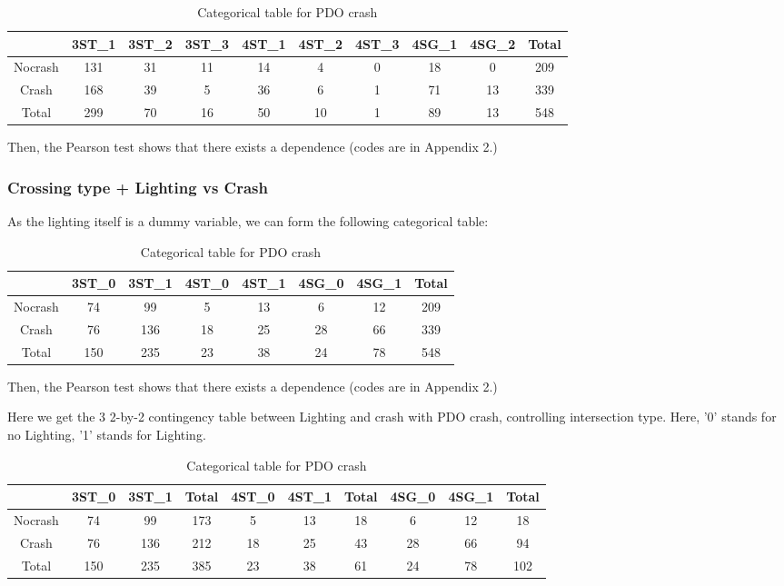 \documentclass[11pt]{scrartcl} %
\begin{document}
\begin{table}[H]
\caption{Categorical table for PDO crash}
\centering
\begin{tabular}{|c|c|c|c|c|c|c|c|c|c|}
\hline
      & 3ST\_1 & 3ST\_2 & 3ST\_3 & 4ST\_1 & 4ST\_2 & 4ST\_3 & 4SG\_1 & 4SG\_2 & Total \\
\hline
Nocrash & 131 & 31  & 11 & 14 & 4 & 0 & 18 & 0 & 209\\
\hline
Crash    & 168  & 39  & 5  & 36 & 6 & 1 & 71 & 13 & 339\\
\hline
Total    & 299  & 70  & 16  & 50 & 10 & 1 & 89 & 13 & 548 \\
\hline
\end{tabular}
\end{table}

Then, the Pearson test shows that there exists a dependence (codes are in Appendix 2.)

\subsubsection{Crossing type + Lighting vs Crash}

As the lighting itself is a dummy variable, we can form the following categorical table:

\begin{table}[H]
\caption{Categorical table for PDO crash}
\centering
\begin{tabular}{|c|c|c|c|c|c|c|c|}
\hline
      & 3ST\_0 & 3ST\_1 & 4ST\_0 & 4ST\_1 & 4SG\_0 & 4SG\_1 & Total \\
\hline
Nocrash & 74 & 99 & 5 & 13 & 6 & 12 & 209\\
\hline
Crash    & 76  & 136  & 18 & 25 & 28 & 66 & 339\\
\hline
Total    & 150  & 235  & 23  & 38 & 24 & 78 & 548 \\
\hline
\end{tabular}
\end{table}

Then, the Pearson test shows that there exists a dependence (codes are in Appendix 2.)

Here we get the 3 2-by-2 contingency table between Lighting and crash with PDO crash, controlling intersection type. Here, '0' stands for no Lighting, '1' stands for Lighting.

\begin{table}[H]
\caption{Categorical table for PDO crash}
\centering
\begin{tabular}{|c|c|c|c|c|c|c|c|c|c|}
\hline
      & 3ST\_0 & 3ST\_1 & Total & 4ST\_0 & 4ST\_1 & Total & 4SG\_0 & 4SG\_1 & Total \\
\hline
Nocrash & 74 & 99 & 173 & 5 & 13 & 18 & 6 & 12 & 18\\
\hline
Crash    & 76  & 136 & 212 & 18 & 25 & 43 & 28 & 66 & 94\\
\hline
Total    & 150  & 235 & 385 & 23  & 38 & 61 & 24 & 78 & 102\\
\hline
\end{tabular}
\end{table}
\end{document}

